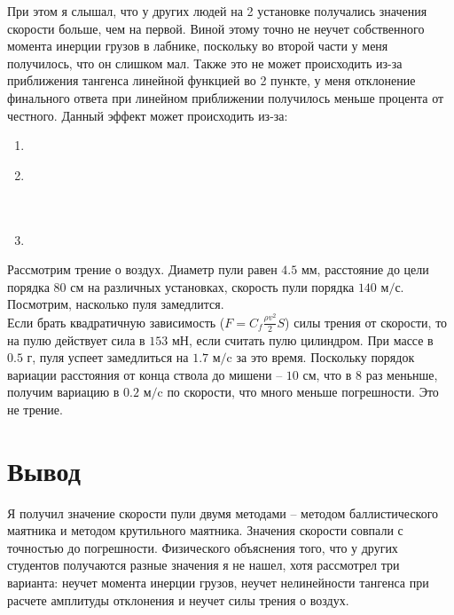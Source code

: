 При этом я слышал, что у других людей на 2 установке получались значения скорости больше, чем на первой. Виной этому точно не неучет собственного момента инерции грузов в лабнике, поскольку во второй части у меня получилось, что он слишком мал. Также это не может происходить из-за приближения тангенса линейной функцией во 2 пункте, у меня отклонение финального ответа при линейном приближении получилось меньше процента от честного. Данный эффект может происходить из-за:
\begin{enumerate}
\item {}
\item {}\\\\\\
\item {}
\end{enumerate}
Рассмотрим трение о воздух. Диаметр пули равен $4.5\text{ мм}$, расстояние до цели порядка $80\text{ см}$ на различных установках, скорость пули порядка $140\text{ м$/$с}$. Посмотрим, насколько пуля замедлится.\\
Если брать квадратичную зависимость ($F=C_f\displaystyle \frac{\rho v^2}{2}S$) силы трения от скорости, то на пулю действует сила в $153\text{ мН}$, если считать пулю цилиндром. При массе в $0.5\text{ г}$, пуля успеет замедлиться на $1.7\text{ м/c}$ за это время. Поскольку порядок вариации расстояния от конца ствола до мишени -- $10\text{ см}$, что в 8 раз меньнше, получим вариацию в $0.2\text{ м/c}$ по скорости, что много меньше погрешности. Это не трение.
\section{Вывод}
Я получил значение скорости пули двумя методами -- методом баллистического маятника и методом крутильного маятника. Значения скорости совпали с точностью до погрешности. Физического объяснения того, что у других студентов получаются разные значения я не нашел, хотя рассмотрел три варианта: неучет момента инерции грузов, неучет нелинейности тангенса при расчете амплитуды отклонения и неучет силы трения о воздух.











